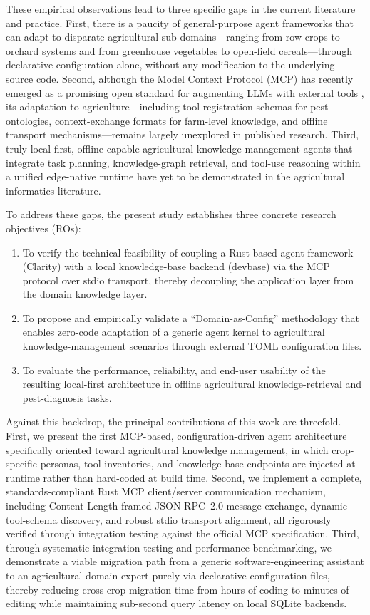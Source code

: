 These empirical observations lead to three specific gaps in the current literature and practice. First, there is a paucity of general-purpose agent frameworks that can adapt to disparate agricultural sub-domains---ranging from row crops to orchard systems and from greenhouse vegetables to open-field cereals---through declarative configuration alone, without any modification to the underlying source code. Second, although the Model Context Protocol (MCP) has recently emerged as a promising open standard for augmenting LLMs with external tools \cite{anthropic2024mcp}, its adaptation to agriculture---including tool-registration schemas for pest ontologies, context-exchange formats for farm-level knowledge, and offline transport mechanisms---remains largely unexplored in published research. Third, truly local-first, offline-capable agricultural knowledge-management agents that integrate task planning, knowledge-graph retrieval, and tool-use reasoning within a unified edge-native runtime have yet to be demonstrated in the agricultural informatics literature.

To address these gaps, the present study establishes three concrete research objectives (ROs):
\begin{enumerate}[label=RO\arabic*:,leftmargin=*]
    \item To verify the technical feasibility of coupling a Rust-based agent framework (Clarity) with a local knowledge-base backend (devbase) via the MCP protocol over stdio transport, thereby decoupling the application layer from the domain knowledge layer.
    \item To propose and empirically validate a ``Domain-as-Config'' methodology that enables zero-code adaptation of a generic agent kernel to agricultural knowledge-management scenarios through external TOML configuration files.
    \item To evaluate the performance, reliability, and end-user usability of the resulting local-first architecture in offline agricultural knowledge-retrieval and pest-diagnosis tasks.
\end{enumerate}

Against this backdrop, the principal contributions of this work are threefold. First, we present the first MCP-based, configuration-driven agent architecture specifically oriented toward agricultural knowledge management, in which crop-specific personas, tool inventories, and knowledge-base endpoints are injected at runtime rather than hard-coded at build time. Second, we implement a complete, standards-compliant Rust MCP client/server communication mechanism, including Content-Length-framed JSON-RPC~2.0 message exchange, dynamic tool-schema discovery, and robust stdio transport alignment, all rigorously verified through integration testing against the official MCP specification. Third, through systematic integration testing and performance benchmarking, we demonstrate a viable migration path from a generic software-engineering assistant to an agricultural domain expert purely via declarative configuration files, thereby reducing cross-crop migration time from hours of coding to minutes of editing while maintaining sub-second query latency on local SQLite backends.

